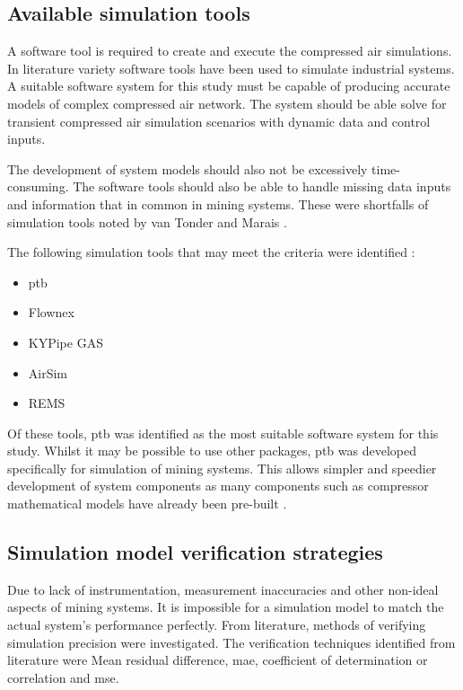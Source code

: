 \subsection{Available simulation tools}
A software tool is required to create and execute the compressed air simulations. In literature variety software tools have been used to simulate industrial systems. A suitable software system for this study must be capable of producing accurate models of complex compressed air network. The system should be able solve for transient compressed air simulation scenarios with dynamic data and control inputs. 
\par 
The development of system models should also not be excessively time-consuming. The software tools should also be able to handle missing data inputs and information that in common in mining systems. These were shortfalls of simulation tools noted by van Tonder \cite{vanTonder2014PhD} and Marais \cite{Mare2016PhD}.
\par
The following simulation tools that may meet the criteria were identified : 
\begin{itemize}
	\item \gls{ptb}
	\item Flownex
	\item KYPipe GAS
	\item AirSim
	\item REMS
\end{itemize}
Of these tools, \gls{ptb} was identified as the most suitable software system for this study. Whilst it may be possible to use other packages, \gls{ptb} was developed specifically for simulation of mining systems. This allows simpler and speedier development of system components as many components such as compressor mathematical models have already been pre-built \cite{Mare2016PhD}. 
 	\subsection{Simulation model verification strategies}\label{VerificationLit}
 	Due to lack of instrumentation, measurement inaccuracies and other non-ideal aspects of mining systems. It is impossible for a simulation model to match the actual system's performance perfectly. From literature, methods of verifying simulation precision were investigated. The verification techniques identified from literature were Mean residual difference, \gls{mae}, coefficient of determination or correlation and \gls{mse}.%
